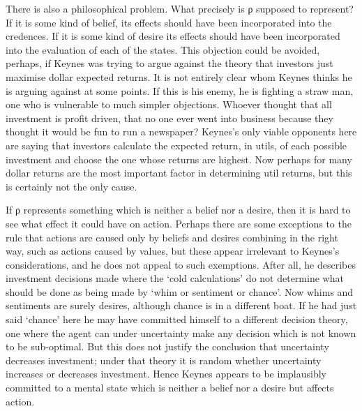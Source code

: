 \documentclass[
  10pt,
  letterpaper,
  DIV=11,
  numbers=noendperiod,
  twoside]{scrartcl}
\begin{document}
There is also a philosophical problem. What precisely is ρ supposed to
represent? If it is some kind of belief, its effects should have been
incorporated into the credences. If it is some kind of desire its
effects should have been incorporated into the evaluation of each of the
states. This objection could be avoided, perhaps, if Keynes was trying
to argue against the theory that investors just maximise dollar expected
returns. It is not entirely clear whom Keynes thinks he is arguing
against at some points. If this is his enemy, he is fighting a straw
man, one who is vulnerable to much simpler objections. Whoever thought
that all investment is profit driven, that no one ever went into
business because they thought it would be fun to run a newspaper?
Keynes's only viable opponents here are saying that investors calculate
the expected return, in utils, of each possible investment and choose
the one whose returns are highest. Now perhaps for many dollar returns
are the most important factor in determining util returns, but this is
certainly not the only cause.

If ρ represents something which is neither a belief nor a desire, then
it is hard to see what effect it could have on action. Perhaps there are
some exceptions to the rule that actions are caused only by beliefs and
desires combining in the right way, such as actions caused by values,
but these appear irrelevant to Keynes's considerations, and he does not
appeal to such exemptions. After all, he describes investment decisions
made where the `cold calculations' do not determine what should be done
as being made by `whim or sentiment or chance'. Now whims and sentiments
are surely desires, although chance is in a different boat. If he had
just said `chance' here he may have committed himself to a different
decision theory, one where the agent can under uncertainty make any
decision which is not known to be sub-optimal. But this does not justify
the conclusion that uncertainty decreases investment; under that theory
it is random whether uncertainty increases or decreases investment.
Hence Keynes appears to be implausibly committed to a mental state which
is neither a belief nor a desire but affects action.
\end{document}
